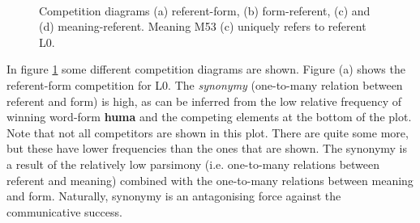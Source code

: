 \begin{figure}[t]
\centering
{}
\\
\caption{Competition diagrams (a) referent-form, (b) form-referent, (c) and (d) meaning-referent. Meaning M53 (c) uniquely refers to referent L0.}
\label{f:st:comp}
\end{figure}

In figure \ref{f:st:comp} some different competition diagrams are shown. Figure (a) shows the referent-form competition for L0. The {\em synonymy} (one-to-many relation between referent and form) is high, as can be inferred from the low relative frequency of winning word-form {\bf huma} and the competing elements at the bottom of the plot. Note that not all competitors are shown in this plot. There are quite some more, but these have lower frequencies than the ones that are shown. The synonymy is a result of the relatively low parsimony (i.e. one-to-many relations between referent and meaning) combined with the one-to-many relations between meaning and form. Naturally, synonymy is an antagonising force against the communicative success.

